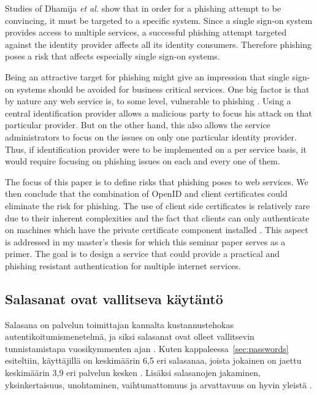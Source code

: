 \documentclass[english,gradu]{tktltiki}
\begin{document}
    Studies of Dhamija \emph{et al.} \cite{why_phishing_works_06} show that in order for a phishing attempt to be convincing, it must be targeted to a specific system. Since a single sign-on system provides access to multiple services, a successful phishing attempt targeted against the identity provider affects all its identity consumers. Therefore phishing poses a risk that affects especially single sign-on systems.

    Being an attractive target for phishing might give an impression that single sign-on systems should be avoided for business critical services. One big factor is that by nature any web service is, to some level, vulnerable to phishing \cite{why_phishing_works_06}. Using a central identification provider allows a malicious party to focus his attack on that particular provider. But on the other hand, this also allows the service administrators to focus on the issues on only one particular identity provider. Thus, if identification provider were to be implemented on a per service basis, it would require focusing on phishing issues on each and every one of them.

    The focus of this paper is to define risks that phishing poses to web services. We then conclude that the combination of OpenID and client certificates could eliminate the risk for phishing. The use of client side certificates is relatively rare due to their inherent complexities and the fact that clients can only authenticate on machines which have the private certificate component installed \cite{owasp_tls_cheatsheet}. This aspect is addressed in my master's thesis for which this seminar paper serves as a primer. The goal is to design a service that could provide a practical and phishing resistant authentication for multiple internet services.



\subsection{Salasanat ovat vallitseva käytäntö} %
\label{sub:salasanat_ovat_vallitseva_käytäntö}
\label{sec:passwords_de_facto}

             Salasana on palvelun toimittajan kannalta kustannustehokas autentikoitumismenetelmä, ja siksi salasanat ovat olleet vallitsevin tunnistamistapa vuosikymmenten ajan \cite{pw_auth_system_perspective_08}. Kuten kappaleessa~\ref{sec:passwords} esiteltiin, käyttäjillä on keskimäärin 6,5 eri salasanaa, joista jokainen on jaettu keskimäärin 3,9 eri palvelun kesken \cite{study_of_passwords_07}. Lisäksi salasanojen jakaminen, yksinkertaisuus, unohtaminen, vaihtumattomuus ja arvattavuus on hyvin yleistä \cite{password_management_strategies_06, pw_auth_system_perspective_08, passpet_06}.
\end{document}
